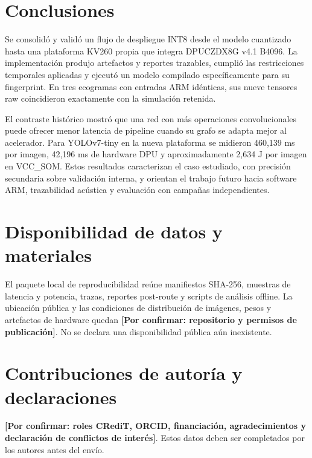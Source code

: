 \documentclass[10pt,conference,a4paper]{elektron}
\newcommand{\pendiente}[1]{\textbf{[Por confirmar: #1]}}
\begin{document}
\section{Conclusiones}
Se consolidó y validó un flujo de despliegue INT8 desde el modelo cuantizado hasta una plataforma KV260 propia que integra DPUCZDX8G v4.1 B4096. La implementación produjo artefactos y reportes trazables, cumplió las restricciones temporales aplicadas y ejecutó un modelo compilado específicamente para su fingerprint. En tres ecogramas con entradas ARM idénticas, sus nueve tensores raw coincidieron exactamente con la simulación retenida.

El contraste histórico mostró que una red con más operaciones convolucionales puede ofrecer menor latencia de pipeline cuando su grafo se adapta mejor al acelerador. Para YOLOv7-tiny en la nueva plataforma se midieron 460,139 ms por imagen, 42,196 ms de hardware DPU y aproximadamente 2,634 J por imagen en VCC\_SOM. Estos resultados caracterizan el caso estudiado, con precisión secundaria sobre validación interna, y orientan el trabajo futuro hacia software ARM, trazabilidad acústica y evaluación con campañas independientes.

\section*{Disponibilidad de datos y materiales}
El paquete local de reproducibilidad reúne manifiestos SHA-256, muestras de latencia y potencia, trazas, reportes post-route y scripts de análisis offline. La ubicación pública y las condiciones de distribución de imágenes, pesos y artefactos de hardware quedan \pendiente{repositorio y permisos de publicación}. No se declara una disponibilidad pública aún inexistente.

\section*{Contribuciones de autoría y declaraciones}
\pendiente{roles CRediT, ORCID, financiación, agradecimientos y declaración de conflictos de interés}. Estos datos deben ser completados por los autores antes del envío.
\end{document}
